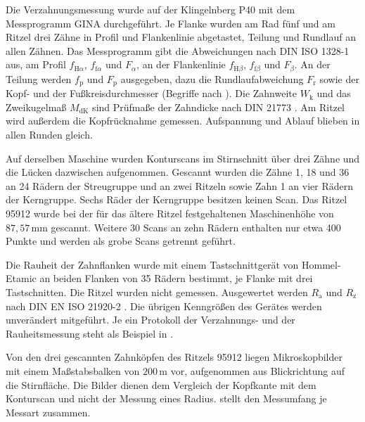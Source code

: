 
Die Verzahnungsmessung wurde auf der Klingelnberg P40 mit dem Messprogramm GINA durchgeführt. Je Flanke wurden am Rad fünf und am Ritzel drei Zähne in Profil und Flankenlinie abgetastet, Teilung und Rundlauf an allen Zähnen. Das Messprogramm gibt die Abweichungen nach DIN ISO 1328-1 \cite{DINISO1328-1} aus, am Profil $f_{\mathrm{H}\alpha}$, $f_{\mathrm{f}\alpha}$ und $F_{\alpha}$, an der Flankenlinie $f_{\mathrm{H}\beta}$, $f_{\mathrm{f}\beta}$ und $F_{\beta}$. An der Teilung werden $f_{\mathrm{p}}$ und $F_{\mathrm{p}}$ ausgegeben, dazu die Rundlaufabweichung $F_{\mathrm{r}}$ sowie der Kopf- und der Fußkreisdurchmesser (Begriffe nach \cite[Abschnitte 5.3 und 5.4, S.~33 und 36]{DIN21772}). Die Zahnweite $W_{\mathrm{k}}$ und das Zweikugelmaß $M_{\mathrm{dK}}$ sind Prüfmaße der Zahndicke nach DIN 21773 \cite{DIN21773}. Am Ritzel wird außerdem die Kopfrücknahme gemessen. Aufspannung und Ablauf blieben in allen Runden gleich.

Auf derselben Maschine wurden Konturscans im Stirnschnitt über drei Zähne und die Lücken dazwischen aufgenommen. Gescannt wurden die Zähne 1, 18 und 36 an 24 Rädern der Streugruppe und an zwei Ritzeln sowie Zahn 1 an vier Rädern der Kerngruppe. Sechs Räder der Kerngruppe besitzen keinen Scan. Das Ritzel 95912 wurde bei der für das ältere Ritzel festgehaltenen Maschinenhöhe von $87{,}57$\,mm gescannt. Weitere 30 Scans an zehn Rädern enthalten nur etwa 400 Punkte und werden als grobe Scans getrennt geführt.

Die Rauheit der Zahnflanken wurde mit einem Tastschnittgerät von Hommel-Etamic an beiden Flanken von 35 Rädern bestimmt, je Flanke mit drei Tastschnitten. Die Ritzel wurden nicht gemessen. Ausgewertet werden $R_{\mathrm{a}}$ und $R_{\mathrm{z}}$ nach DIN EN ISO 21920-2 \cite{DINENISO21920-2}. Die übrigen Kenngrößen des Gerätes werden unverändert mitgeführt. Je ein Protokoll der Verzahnungs- und der Rauheitsmessung steht als Beispiel in .

Von den drei gescannten Zahnköpfen des Ritzels 95912 liegen Mikroskopbilder mit einem Maßstabsbalken von $200$\,\textmu m vor, aufgenommen aus Blickrichtung auf die Stirnfläche. Die Bilder dienen dem Vergleich der Kopfkante mit dem Konturscan und nicht der Messung eines Radius.  stellt den Messumfang je Messart zusammen.

